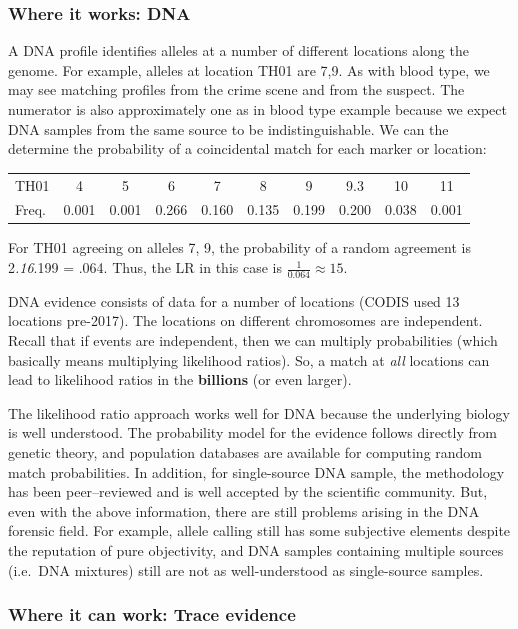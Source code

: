 \documentclass[]{book}
\theoremstyle{definition}
\theoremstyle{definition}
\theoremstyle{remark}
\begin{document}
\subsubsection{Where it works: DNA}\label{where-it-works-dna}

A DNA profile identifies alleles at a number of different locations
along the genome. For example, alleles at location TH01 are 7,9. As with
blood type, we may see matching profiles from the crime scene and from
the suspect. The numerator is also approximately one as in blood type
example because we expect DNA samples from the same source to be
indistinguishable. We can the determine the probability of a
coincidental match for each marker or location:

\begin{tabular}{lccccccccc}
TH01 & 4 & 5 & 6 & 7 & 8 & 9 & 9.3 & 10 & 11 \\ 
Freq. & 0.001 & 0.001 & 0.266 & 0.160 & 0.135 & 0.199 & 0.200  & 0.038 & 0.001
\end{tabular}

For TH01 agreeing on alleles 7, 9, the probability of a random agreement
is 2\emph{.16}.199 = .064. Thus, the LR in this case is
\(\frac{1}{0.064} \approx 15\).

DNA evidence consists of data for a number of locations (CODIS used 13
locations pre-2017). The locations on different chromosomes are
independent. Recall that if events are independent, then we can multiply
probabilities (which basically means multiplying likelihood ratios). So,
a match at \emph{all} locations can lead to likelihood ratios in the
\textbf{billions} (or even larger).

The likelihood ratio approach works well for DNA because the underlying
biology is well understood. The probability model for the evidence
follows directly from genetic theory, and population databases are
available for computing random match probabilities. In addition, for
single-source DNA sample, the methodology has been peer--reviewed and is
well accepted by the scientific community. But, even with the above
information, there are still problems arising in the DNA forensic field.
For example, allele calling still has some subjective elements despite
the reputation of pure objectivity, and DNA samples containing multiple
sources (i.e.~DNA mixtures) still are not as well-understood as
single-source samples.

\subsubsection{Where it can work: Trace
evidence}\label{where-it-can-work-trace-evidence}
\end{document}
